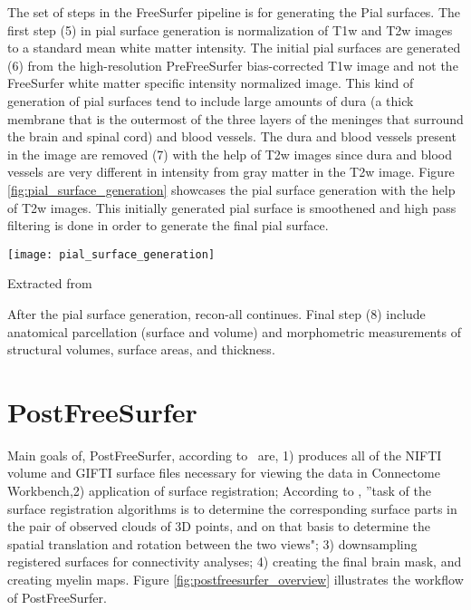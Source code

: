 The set of steps in the FreeSurfer pipeline is for generating the Pial surfaces. The first step (5) in pial surface generation is normalization of T1w and T2w images to a standard mean white matter intensity. The initial pial surfaces are generated (6) from the high-resolution PreFreeSurfer bias-corrected T1w image and not the FreeSurfer white matter specific intensity normalized image. This kind of generation of pial surfaces tend to include large amounts of dura (a thick membrane that is the outermost of the three layers of the meninges that surround the brain and spinal cord) and blood vessels. The dura and blood vessels present in the image are removed (7) with the help of T2w images since dura and blood vessels are very different in intensity from gray matter in the T2w image. Figure \ref{fig:pial_surface_generation} showcases the pial surface generation with the help of T2w images. This initially generated pial surface is smoothened and high pass filtering is done in order to generate the final pial surface.

\begin{center}
  \texttt{[image: pial\_surface\_generation]}
  \label{fig:pial_surface_generation}
  \caption*{Extracted from \cite{Gla13}}
\end{center}

After the pial surface generation, recon-all continues. Final step (8) include anatomical parcellation (surface and volume) and morphometric measurements of structural volumes, surface areas, and thickness.

\section{PostFreeSurfer} \label{sec:PostFreeSurfer}
Main goals of, PostFreeSurfer, according to~\cite{Gla13} are, 1) produces all of the NIFTI volume and GIFTI surface files necessary for viewing the data in Connectome Workbench,2) application of surface registration; According to \cite{DBLP:journals/corr/HrgeticP13}, ''task of the surface registration algorithms is to determine the corresponding surface parts in the pair of observed clouds of 3D points, and on that basis to determine the spatial translation and rotation between the two views"; 3) downsampling registered surfaces for connectivity analyses; 4) creating the final brain mask, and creating myelin maps. Figure \ref{fig:postfreesurfer_overview} illustrates the workflow of PostFreeSurfer.\\

